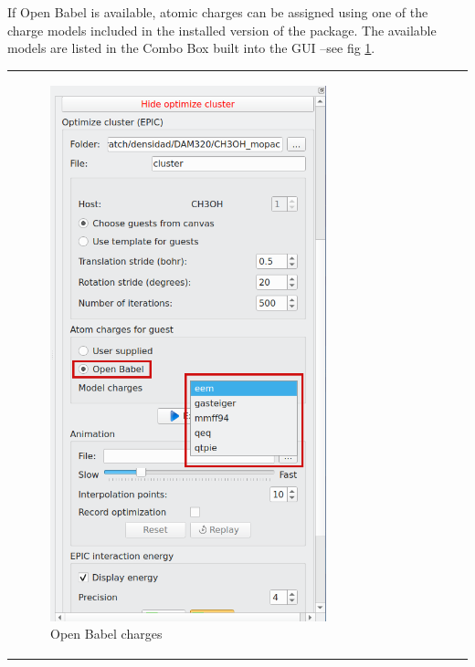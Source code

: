 \documentclass[10pt]{article}
\begin{document}
If Open Babel is available, atomic charges can be assigned using one of the charge  
models included in the installed version of the package. The available models are  
listed in the Combo Box built into the GUI --see fig \ref{fig:4_10_5}.

 
\begin{tabular}{lcr}
\begin{minipage}{.45\linewidth}
    \begin{figure}[H]
        \begin{center}
            \includegraphics[width=0.5\linewidth]{damqt320_mespimizer_5b.png}
        \end{center}
        \caption{Open Babel charges \label{fig:4_10_5}}
    \end{figure}
\end{minipage}
&
\begin{minipage}{.45\linewidth}
    \begin{figure}[H]
        \begin{center}
            \vspace*{0mm}

\end{center}
\end{figure}
\end{minipage}
\end{tabular}
\end{document}

